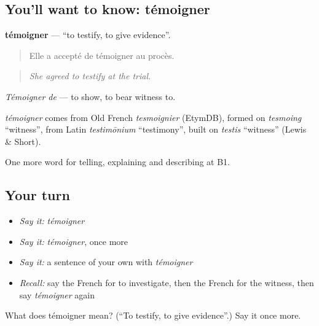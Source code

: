 \subsection*{You'll want to know: témoigner}
\textbf{témoigner} — \textquotedblleft{}to testify, to give evidence\textquotedblright{}.

\begin{quote}
Elle a accepté de témoigner au procès.
\end{quote}

\begin{quote}
\emph{She agreed to testify at the trial.}
\end{quote}

\emph{Témoigner de} — to show, to bear witness to.

\begin{cousinweb}
\emph{témoigner} comes from Old French \emph{tesmoignier} (EtymDB), formed on \emph{tesmoing} \textquotedblleft{}witness\textquotedblright{}, from Latin \emph{testimōnium} \textquotedblleft{}testimony\textquotedblright{}, built on \emph{testis} \textquotedblleft{}witness\textquotedblright{} (Lewis \& Short).
\end{cousinweb}

\begin{grammarlens}[title={What you've built}]
One more word for telling, explaining and describing at B1.
\end{grammarlens}

\subsection*{Your turn}
\begin{itemize}
\raggedright
  \item \emph{Say it:} \emph{témoigner}
  \item \emph{Say it:} \emph{témoigner}, once more
  \item \emph{Say it:} a sentence of your own with \emph{témoigner}
  \item \emph{Recall:} say the French for to investigate, then the French for the witness, then say \emph{témoigner} again
\end{itemize}

\begin{tcolorbox}[breakable,colback=teal!4,colframe=teal!35!black,title={Before you move on}]
What does témoigner mean? (\textquotedblleft{}To testify, to give evidence\textquotedblright{}.) Say it once more.
\end{tcolorbox}
